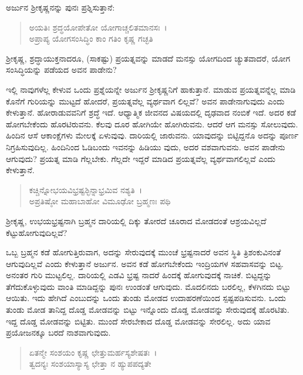 ಅರ್ಜುನ ಶ‍್ರೀಕೃಷ್ಣನನ್ನು ಪುನಃ ಪ್ರಶ್ನಿಸುತ್ತಾನೆ:

\begin{verse}
ಅಯತಿಃ ಶ್ರದ್ಧಯೋಪೇತೋ ಯೋಗಾಚ್ಚಲಿತಮಾನಸಃ~।\\ಅಪ್ರಾಪ್ಯ ಯೋಗಸಂಸಿದ್ಧಿಂ ಕಾಂ ಗತಿಂ ಕೃಷ್ಣ ಗಚ್ಛತಿ 
\end{verse}

{\small ಶ‍್ರೀಕೃಷ್ಣ, ಶ್ರದ್ಧಾಯುಕ್ತನಾದರೂ, (ಸಾಕಷ್ಟು) ಪ್ರಯತ್ನವನ್ನು ಮಾಡದೆ ಮನಸ್ಸು ಯೋಗದಿಂದ ಚ್ಯುತವಾದರೆ, ಯೋಗ ಸಂಸಿದ್ಧಿಯನ್ನು ಪಡೆಯದ ಅವನ ಪಾಡೇನು?}

ಇಲ್ಲಿ ನಾವುಗಳೆಲ್ಲ ಕೇಳುವ ಒಂದು ಪ್ರಶ್ನೆಯನ್ನೇ ಅರ್ಜುನ ಶ‍್ರೀಕೃಷ್ಣನಿಗೆ ಹಾಕುತ್ತಾನೆ. ಮಾಡುವ ಪ್ರಯತ್ನವನ್ನೆಲ್ಲ ಮಾಡಿ ಕೊನೆಗೆ ಗುರಿಯನ್ನು ಮುಟ್ಟದೆ ಹೋದರೆ, ಪ್ರಯತ್ನವೆಲ್ಲ ವ್ಯರ್ಥವಾಗ ಲಿಲ್ಲವೆ? ಅವನ ಪಾಡೇನಾಗುವುದು ಎಂದು ಕೇಳುತ್ತಾನೆ. ಹೋರಾಡುವವನಿಗೆ ಶ್ರದ್ಧೆ ಇದೆ. ಆಧ್ಯಾತ್ಮಿಕ ಜೀವನದ ವಿಷಯದಲ್ಲಿ ದೃಢವಾದ ನಂಬಿಕೆ ಇದೆ. ಅದರ ಕಡೆ ಹೋಗಬೇಕೆಂದು ಹೊರಟಿರುವನು. ಕೆಲವು ದೂರ ಹೋಗಿಯೇ ಹೋಗಿರುವನು. ಆದರೆ ಆಗ ಮನಸ್ಸು ಸೋಲುವುದು. ಹಿಂದಿನ ಆಸೆ ಆಕಾಂಕ್ಷೆಗಳು ಮೇಲಕ್ಕೆ ಏಳುವುವು. ದಾರಿಯಲ್ಲಿ ಜಾರುವನು. ಯಾವುದನ್ನು ಬಿಟ್ಟಿದ್ದನೊ ಅದನ್ನು ಪೂರ್ಣ ನಿಗ್ರಹಿಸುವುದಿಲ್ಲ. ಹಿಂದಿನಿಂದ ಓಡಿಬಂದು ಇವನನ್ನು ಹಿಡಿಯು ವುದು, ಅದರ ವಶವಾಗುವನು. ಅವನ ಪಾಡೇನು ಆಗುವುದು? ಪ್ರಯತ್ನ ಮಾಡಿ ಗೆಲ್ಲಬೇಕು. ಗೆಲ್ಲದೇ ಇದ್ದರೆ ಮಾಡಿದ ಪ್ರಯತ್ನವೆಲ್ಲ ವ್ಯರ್ಥವಾಗಲಿಲ್ಲವೆ ಎಂದು ಕೇಳುತ್ತಾನೆ.

\begin{verse}
ಕಚ್ಚಿನ್ನೋಭಯವಿಭ್ರಷ್ಟಶ್ಛಿನ್ನಾಭ್ರಮಿವ ನಶ್ಯತಿ~।\\ಅಪ್ರತಿಷ್ಠೋ ಮಹಾಬಾಹೋ ವಿಮೂಢೋ ಬ್ರಹ್ಮಣಃ ಪಥಿ 
\end{verse}

{\small ಶ‍್ರೀಕೃಷ್ಣ, ಉಭಯಭ್ರಷ್ಟನಾಗಿ ಬ್ರಹ್ಮನ ದಾರಿಯಲ್ಲಿ ದಿಕ್ಕು ತೋರದೆ ಚೂರಾದ ಮೋಡದಂತೆ ಆಶ್ರಯವಿಲ್ಲದೆ ಕೆಟ್ಟುಹೋಗುವುದಿಲ್ಲವೆ?}

ಒಬ್ಬ ಬ್ರಹ್ಮನ ಕಡೆ ಹೋಗುತ್ತಿರುವಾಗ, ಅದನ್ನು ಸೇರುವುದಕ್ಕೆ ಮುಂಚೆ ಭ್ರಷ್ಟನಾದರೆ ಅವನ ಸ್ಥಿತಿ ತ್ರಿಶಂಕುವಿನಂತೆ ಆಗುವುದಿಲ್ಲವೆ ಎಂದು ಕೇಳುತ್ತಾನೆ ಅರ್ಜುನ. ಅವನ ಕಡೆ ಹೋಗಬೇಕೆಂದು ಇಂದ್ರಿಯಗಳ ಸಹವಾಸವನ್ನು ಬಿಟ್ಟ. ಅನಂತರ ಗುರಿ ಮುಟ್ಟಲಿಲ್ಲ. ದಾರಿಯಲ್ಲಿ ಎಡವಿ ಭ್ರಷ್ಟ ನಾದರೆ ಹಿಂದಕ್ಕೆ ಹೋಗುವುದಕ್ಕೆ ನಾಚಿಕೆ. ಬಿಟ್ಟದ್ದನ್ನು ತೆಗೆದುಕೊಳ್ಳುವುದು ವಾಂತಿ ಮಾಡಿದ್ದನ್ನು ಪುನಃ ಉಂಡಂತೆ ಆಗುವುದು. ಮೊದಲಿನದು ಬರಲಿಲ್ಲ, ಕೆಳಗಿನದು ಬಿಟ್ಟು ಆಯಿತು. ಇದು ಹೇಗಿದೆ ಎಂಬುದನ್ನು ಒಂದು ತುಂಡು ಮೋಡದ ಉದಾಹರಣೆಯಿಂದ ಸ್ಪಷ್ಟಪಡಿಸುವನು. ಒಂದು ತುಂಡು ಮೋಡ ತಾನಿದ್ದ ದೊಡ್ಡ ಮೋಡವನ್ನು ಬಿಟ್ಟು ಇನ್ನೊಂದು ದೊಡ್ಡ ಮೋಡವನ್ನು ಸೇರುವುದಕ್ಕೆ ಹೊರಟಿತು. ಇದ್ದ ದೊಡ್ಡ ಮೋಡವನ್ನು ಬಿಟ್ಟಿತು. ಮುಂದೆ ಸೇರಬೇಕಾದ ದೊಡ್ಡ ಮೋಡವನ್ನು ಸೇರಲಿಲ್ಲ. ಅದು ಯಾವ ಪ್ರಯೋಜನಕ್ಕೂ ಬರದೆ ನಾಶವಾಗುವುದು.

\begin{verse}
ಏತನ್ಮೇ ಸಂಶಯಂ ಕೃಷ್ಣ ಛೇತ್ತುಮರ್ಹಸ್ಯಶೇಷತಃ~।\\ತ್ವದನ್ಯಃ ಸಂಶಯಾಸ್ಯಾಸ್ಯ ಛೇತ್ತಾ ನ ಹ್ಯುಪಪದ್ಯತೇ 
\end{verse}


